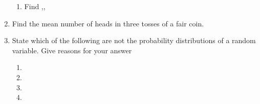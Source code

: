 \begin{enumerate}[label=\thechapter.\arabic*,ref=\thechapter.\theenumi]
\begin{enumerate}
\item  Find ,,  
		\end{enumerate}
\solution

\item 
Find the mean number of heads in three tosses of a fair coin.
\\
\solution

\item State which of the following are not the probability distributions of a random 
variable. Give reasons for your answer
\renewcommand{\labelenumii}{\roman{enumii}}
\begin{enumerate}

\item \begin{table}[ht!]\centering

\end{table}

\item \begin{table}[ht!]\centering

\end{table}

\item  \begin{table}[ht!]\centering
	
\end{table}

\item  \begin{table}[ht!]\centering
	
\end{table} 



\end{enumerate}
\end{enumerate}
